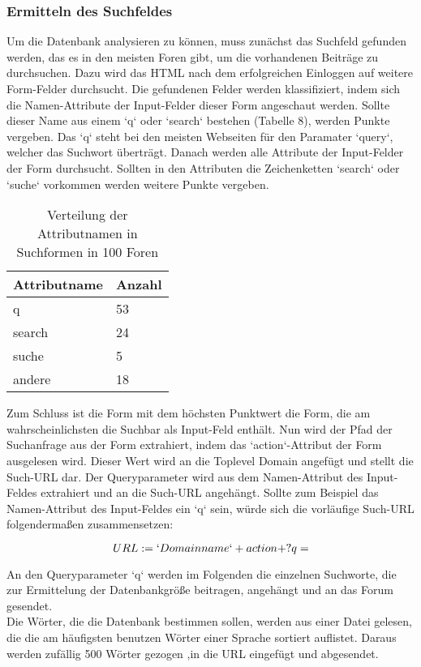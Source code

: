 \subsubsection{Ermitteln des Suchfeldes}
Um die Datenbank analysieren zu können, muss zunächst das Suchfeld gefunden werden, das es in den meisten Foren gibt, um die vorhandenen Beiträge zu durchsuchen.
Dazu wird das HTML nach dem erfolgreichen Einloggen auf weitere Form-Felder durchsucht. Die gefundenen Felder werden klassifiziert, indem sich die Namen-Attribute der Input-Felder dieser Form angeschaut werden. Sollte dieser Name aus einem `q` oder `search` bestehen (Tabelle 8), werden Punkte vergeben. Das `q` steht bei den meisten Webseiten für den Paramater `query`, welcher das Suchwort überträgt.
Danach werden alle Attribute der Input-Felder der Form durchsucht. Sollten in den Attributen die Zeichenketten `search` oder `suche` vorkommen werden weitere Punkte vergeben.

\begin{table}[h!]
\centering 
\begin{tabular}{ | p{3cm} | p{3cm}|} \hline
Attributname & Anzahl \\ \hline
q & 53 \\ \hline
search & 24 \\ \hline
suche & 5 \\ \hline
andere & 18 \\ \hline
\end{tabular}
\caption{Verteilung der Attributnamen in Suchformen in 100 Foren}
\end{table}

Zum Schluss ist die Form mit dem höchsten Punktwert die Form, die am wahrscheinlichsten die Suchbar als Input-Feld enthält.
Nun wird der Pfad der Suchanfrage aus der Form extrahiert, indem das `action`-Attribut der Form ausgelesen wird. Dieser Wert wird an die Toplevel Domain angefügt und stellt die Such-URL dar. Der Queryparameter wird aus dem Namen-Attribut des Input-Feldes extrahiert und an die Such-URL angehängt. Sollte zum Beispiel das Namen-Attribut des Input-Feldes ein `q` sein, würde sich die vorläufige Such-URL folgendermaßen zusammensetzen:

\[ URL := `Domainname` + action + ?q= \]

An den Queryparameter `q` werden im Folgenden die einzelnen Suchworte, die zur Ermittelung der Datenbankgröße beitragen, angehängt und an das Forum gesendet.\\
Die Wörter, die die Datenbank bestimmen sollen, werden aus einer Datei gelesen, die die am häufigsten benutzen Wörter einer Sprache sortiert auflistet. Daraus werden zufällig 500 Wörter gezogen ,in die URL eingefügt und abgesendet.

